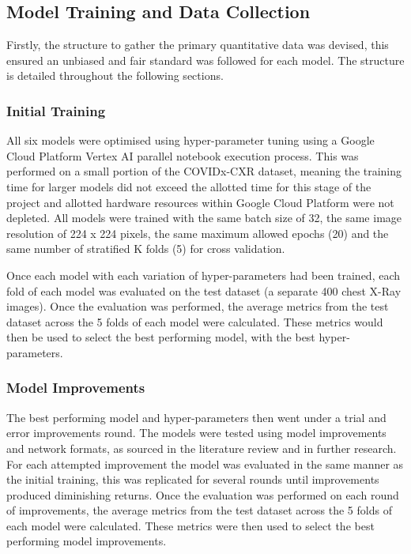 \subsection{Model Training and Data Collection} \label{model-training}
Firstly, the structure to gather the primary quantitative data was devised, this ensured an unbiased and fair standard was followed for each model. The structure is detailed throughout the following sections.


\subsubsection{Initial Training}
All six models were optimised using hyper-parameter tuning using a Google Cloud Platform Vertex AI parallel notebook execution process. This was performed on a small portion of the COVIDx-CXR dataset, meaning the training time for larger models did not exceed the allotted time for this stage of the project and allotted hardware resources within Google Cloud Platform were not depleted. All models were trained with the same batch size of 32, the same image resolution of 224 x 224 pixels, the same maximum allowed epochs (20) and the same number of stratified K folds (5) for cross validation.

Once each model with each variation of hyper-parameters had been trained, each fold of each model was evaluated on the test dataset (a separate 400 chest X-Ray images). Once the evaluation was performed, the average metrics from the test dataset across the 5 folds of each model were calculated. These metrics would then be used to select the best performing model, with the best hyper-parameters.

\subsubsection{Model Improvements}
The best performing model and hyper-parameters then went under a trial and error improvements round. The models were tested using model improvements and network formats, as sourced in the literature review and in further research. For each attempted improvement the model was evaluated in the same manner as the initial training, this was replicated for several rounds until improvements produced diminishing returns. Once the evaluation was performed on each round of improvements, the average metrics from the test dataset across the 5 folds of each model were calculated. These metrics were then used to select the best performing model improvements.

